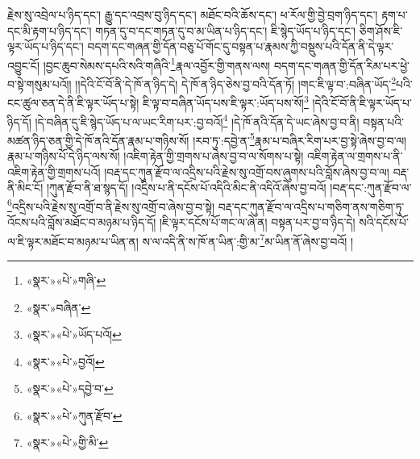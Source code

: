 རྗེས་སུ་འབྲེལ་པ་ཉིད་དང་། རྒྱུ་དང་འབྲས་བུ་ཉིད་དང་། མཐོང་བའི་ཆོས་དང་། ཕ་རོལ་གྱི་བྱེ་བྲག་ཉིད་དང་། རྟག་པ་དང་མི་རྟག་པ་ཉིད་དང་། གཏན་དུ་བ་དང་གཏན་དུ་བ་མ་ཡིན་པ་ཉིད་དང་། ཇི་སྙེད་ཡོད་པ་ཉིད་དང་། ཅིག་ཤོས་ཇི་ལྟར་ཡོད་པ་ཉིད་དང་། བདག་དང་གཞན་གྱི་དོན་བཅུ་པོ་གོང་དུ་བསྟན་པ་རྣམས་ཀྱི་བསྡུས་པའི་དོན་ནི་དེ་ལྟར་འབྱུང་ངོ། །བྱང་ཆུབ་སེམས་དཔའི་སའི་གཞིའི་\footnote{«སྣར་»«པེ་»གཞི་}རྣལ་འབྱོར་གྱི་གནས་ལས། བདག་དང་གཞན་གྱི་དོན་རིམ་པར་ཕྱེ་བ་སྟེ་གསུམ་པའོ།། །།དེའི་ངོ་བོ་ནི་དེ་ཁོ་ན་ཉིད་དེ། དེ་ཁོ་ན་ཉིད་ཅེས་བྱ་བའི་དོན་ཏོ། །གང་ཇི་ལྟ་བ་:བཞིན་ཡོད་\footnote{«སྣར་»བཞིན་}པའི་ངང་ཚུལ་ཅན་དེ་ནི་ཇི་ལྟར་ཡོད་པ་སྟེ། ཇི་ལྟ་བ་བཞིན་ཡོད་པས་ཇི་ལྟར་:ཡོད་པས་སོ།\footnote{«སྣར་»«པེ་»ཡོད་པའོ།} །དེའི་ངོ་བོ་ནི་ཇི་ལྟར་ཡོད་པ་ཉིད་དོ། །དེ་བཞིན་དུ་ཇི་སྙེད་ཡོད་པ་ལ་ཡང་རིག་པར་:བྱ་བའོ།\footnote{«སྣར་»«པེ་»བྱའོ།} །དེ་ཁོ་ནའི་དོན་དེ་ཡང་ཞེས་བྱ་བ་ནི། བསྟན་པའི་མཚན་ཉིད་ཅན་གྱི་དེ་ཁོ་ནའི་དོན་རྣམ་པ་གཉིས་སོ། །རབ་ཏུ་:དབྱེ་ན་\footnote{«སྣར་»«པེ་»དབྱེ་བ་}རྣམ་པ་བཞིར་རིག་པར་བྱ་སྟེ་ཞེས་བྱ་བ་ལ། རྣམ་པ་གཉིས་པོ་དེ་ཉིད་ལས་སོ། །འཇིག་རྟེན་གྱི་གྲགས་པ་ཞེས་བྱ་བ་ལ་སོགས་པ་སྟེ། འཇིག་རྟེན་ལ་གྲགས་པ་ནི་འཇིག་རྟེན་གྱི་གྲགས་པའོ། །བརྡ་དང་ཀུན་རྫོབ་ལ་འདྲིས་པའི་རྗེས་སུ་འགྲོ་བས་ཞུགས་པའི་བློས་ཞེས་བྱ་བ་ལ། བརྡ་ནི་མིང་ངོ། །ཀུན་རྫོབ་ནི་ཐ་སྙད་དོ། །འདྲིས་པ་ནི་དངོས་པོ་འདིའི་མིང་ནི་འདིའོ་ཞེས་བྱ་བའོ། །བརྡ་དང་:ཀུན་རྫོབ་ལ་\footnote{«སྣར་»«པེ་»ཀུན་རྫོབ་}འདྲིས་པའི་རྗེས་སུ་འགྲོ་བ་ནི་རྗེས་སུ་འགྲོ་བ་ཞེས་བྱ་བ་སྟེ། བརྡ་དང་ཀུན་རྫོབ་ལ་འདྲིས་པ་གཅིག་ནས་གཅིག་ཏུ་འོངས་པའི་བློས་མཐོང་བ་མཉམ་པ་ཉིད་དོ། །ཇི་ལྟར་དངོས་པོ་གང་ལ་ཞེ་ན། བསྟན་པར་བྱ་བ་ཉིད་དེ། སའི་དངོས་པོ་ལ་ཇི་ལྟར་མཐོང་བ་མཉམ་པ་ཡིན་ན། ས་ལ་འདི་ནི་ས་ཁོ་ན་ཡིན་:གྱི་མ་\footnote{«སྣར་»«པེ་»གྱི་མི་}མ་ཡིན་ནོ་ཞེས་བྱ་བའོ། །
